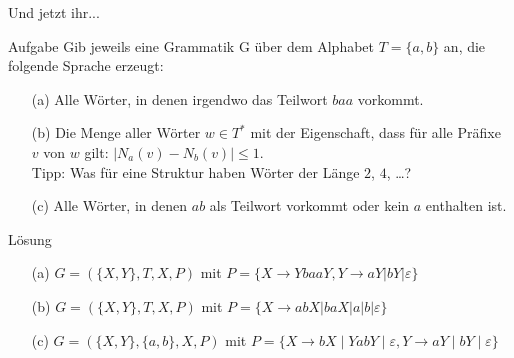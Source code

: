 \begin{frame}{Und jetzt ihr...}
\small
	\begin{exampleblock}{Aufgabe}
		Gib jeweils eine Grammatik G über dem Alphabet $T = \{a, b\}$ an, die folgende Sprache erzeugt:
		\begin{itemize}
				\item[(a)] Alle Wörter, in denen irgendwo das Teilwort $baa$ vorkommt.
				\item[(b)] Die Menge aller Wörter $w\in T^*$ mit der Eigenschaft, dass
						für alle Präfixe $v$ von $w$ gilt: $|N_a(v) - N_b(v)| \leq
						1$.\\
						Tipp: Was für eine Struktur haben Wörter der Länge $2$, $4$, \dots? \\
				\item[(c)] Alle Wörter, in denen $ab$ als Teilwort vorkommt oder kein $a$ enthalten ist.
			\end{itemize}	
	\end{exampleblock}
\pause
	\begin{block}{Lösung}
		\begin{itemize}
			\item[(a)] $G = (\{X,Y\},T,X,P)$ mit $P=\{X \to YbaaY, Y \to aY|bY|\varepsilon\}$
			\item[(b)] $G = (\{X,Y\},T,X,P)$ mit $P=\{X \to abX|baX|a|b|\varepsilon\}$
			\item[(c)] $G = (\{X, Y\}, \{a,b\}, X, P)$ mit $P = \{X \to bX \mid YabY \mid \varepsilon, Y \to aY \mid bY \mid \varepsilon\}$
		\end{itemize}
	\end{block}
\end{frame}

